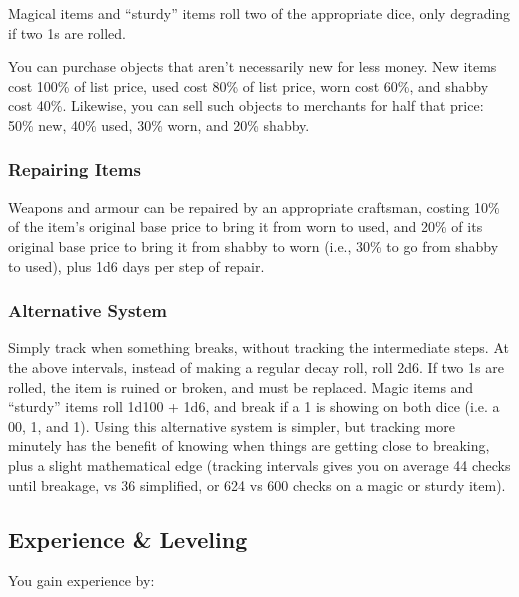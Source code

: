 \documentclass{book}
\begin{document}
Magical items and ``sturdy'' items roll two of the appropriate dice,
only degrading if two 1s are rolled.

You can purchase objects that aren't necessarily new for less money. New
items cost 100\% of list price, used cost 80\% of list price, worn cost
60\%, and shabby cost 40\%. Likewise, you can sell such objects to
merchants for half that price: 50\% new, 40\% used, 30\% worn, and 20\%
shabby.

\subsubsection*{Repairing Items}\label{repairing-items}

Weapons and armour can be repaired by an appropriate craftsman, costing
10\% of the item's original base price to bring it from worn to used,
and 20\% of its original base price to bring it from shabby to worn
(i.e., 30\% to go from shabby to used), plus 1d6 days per step of
repair.

\subsubsection*{Alternative System}\label{alternative-system}

Simply track when something breaks, without tracking the intermediate
steps. At the above intervals, instead of making a regular decay roll,
roll 2d6. If two 1s are rolled, the item is ruined or broken, and must
be replaced. Magic items and ``sturdy'' items roll 1d100 + 1d6, and
break if a 1 is showing on both dice (i.e. a 00, 1, and 1). Using this
alternative system is simpler, but tracking more minutely has the
benefit of knowing when things are getting close to breaking, plus a
slight mathematical edge (tracking intervals gives you on average 44
checks until breakage, vs 36 simplified, or 624 vs 600 checks on a magic
or sturdy item).

\subsection*{Experience \& Leveling}\label{experience-leveling}

You gain experience by:
\end{document}
